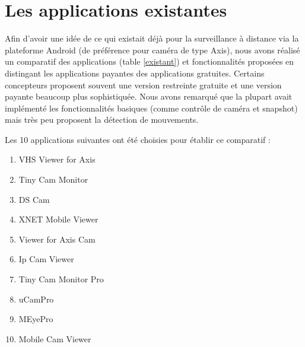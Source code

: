 \section{Les applications existantes}
Afin d'avoir une idée de ce qui existait déjà pour la surveillance à distance
via la plateforme Android (de préférence pour caméra de type Axis), nous avons
réalisé un comparatif des applications (table \ref{existant}) et fonctionnalités
proposées en distingant les applications payantes des applications gratuites. Certains concepteurs proposent souvent une version restreinte gratuite et une version payante beaucoup plus sophistiquée. Nous
avons remarqué que la plupart avait implémenté les fonctionnalités basiques (comme contrôle de caméra et snapshot) mais très peu proposent la détection de mouvements.
\newline

Les 10 applications suivantes ont été choisies pour établir ce comparatif :
\begin{enumerate}
  \item VHS Viewer for Axis
  \item Tiny Cam Monitor
  \item DS Cam
  \item XNET Mobile Viewer
  \item Viewer for Axis Cam
  \item Ip Cam Viewer
  \item Tiny Cam Monitor Pro
  \item uCamPro
  \item MEyePro
  \item Mobile Cam Viewer
  \newline
\end{enumerate}

